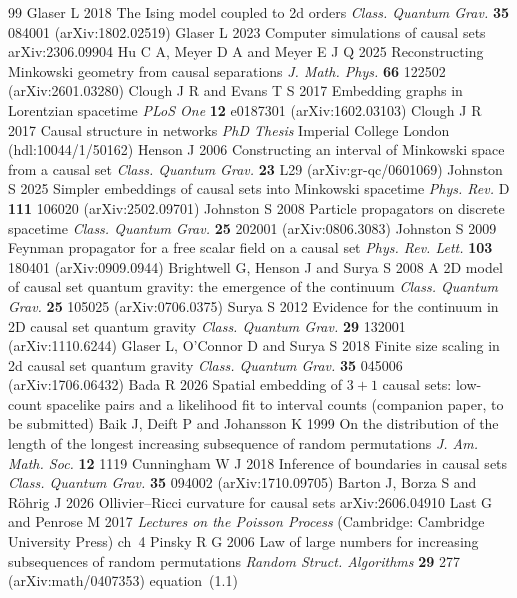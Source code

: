 \documentclass[12pt]{iopart}
\begin{document}
\begin{thebibliography}{99}
 Glaser L 2018 The Ising model coupled to 2d orders {\it Class. Quantum Grav.} {\bf 35} 084001 (arXiv:1802.02519)
 Glaser L 2023 Computer simulations of causal sets arXiv:2306.09904
 Hu C A, Meyer D A and Meyer E J Q 2025 Reconstructing Minkowski geometry from causal separations {\it J. Math. Phys.} {\bf 66} 122502 (arXiv:2601.03280)
 Clough J R and Evans T S 2017 Embedding graphs in Lorentzian spacetime {\it PLoS One} {\bf 12} e0187301 (arXiv:1602.03103)
 Clough J R 2017 Causal structure in networks {\it PhD Thesis} Imperial College London (hdl:10044/1/50162)
 Henson J 2006 Constructing an interval of Minkowski space from a causal set {\it Class. Quantum Grav.} {\bf 23} L29 (arXiv:gr-qc/0601069)
 Johnston S 2025 Simpler embeddings of causal sets into Minkowski spacetime {\it Phys. Rev.} D {\bf 111} 106020 (arXiv:2502.09701)
 Johnston S 2008 Particle propagators on discrete spacetime {\it Class. Quantum Grav.} {\bf 25} 202001 (arXiv:0806.3083)
 Johnston S 2009 Feynman propagator for a free scalar field on a causal set {\it Phys. Rev. Lett.} {\bf 103} 180401 (arXiv:0909.0944)
 Brightwell G, Henson J and Surya S 2008 A 2D model of causal set quantum gravity: the emergence of the continuum {\it Class. Quantum Grav.} {\bf 25} 105025 (arXiv:0706.0375)
 Surya S 2012 Evidence for the continuum in 2D causal set quantum gravity {\it Class. Quantum Grav.} {\bf 29} 132001 (arXiv:1110.6244)
 Glaser L, O'Connor D and Surya S 2018 Finite size scaling in 2d causal set quantum gravity {\it Class. Quantum Grav.} {\bf 35} 045006 (arXiv:1706.06432)
 Bada R 2026 Spatial embedding of $3+1$ causal sets: low-count spacelike pairs and a likelihood fit to interval counts (companion paper, to be submitted)
 Baik J, Deift P and Johansson K 1999 On the distribution of the length of the longest increasing subsequence of random permutations {\it J. Am. Math. Soc.} {\bf 12} 1119
 Cunningham W J 2018 Inference of boundaries in causal sets {\it Class. Quantum Grav.} {\bf 35} 094002 (arXiv:1710.09705)
 Barton J, Borza S and R\"ohrig J 2026 Ollivier--Ricci curvature for causal sets arXiv:2606.04910
 Last G and Penrose M 2017 {\it Lectures on the Poisson Process} (Cambridge: Cambridge University Press) ch~4
 Pinsky R G 2006 Law of large numbers for increasing subsequences of random permutations {\it Random Struct. Algorithms} {\bf 29} 277 (arXiv:math/0407353) equation~(1.1)

\end{thebibliography}
\end{document}
